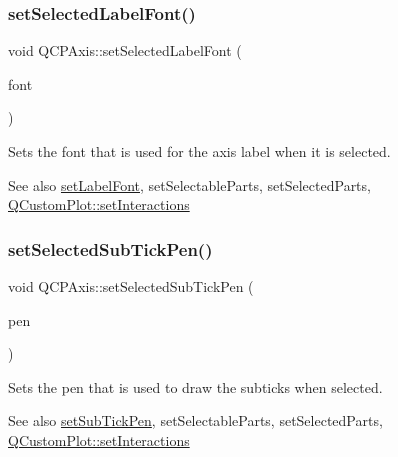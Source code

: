 \subsubsection{\texorpdfstring{set\+Selected\+Label\+Font()}{setSelectedLabelFont()}}
{\footnotesize\ttfamily void Q\+C\+P\+Axis\+::set\+Selected\+Label\+Font (\begin{DoxyParamCaption}\item[{const Q\+Font \&}]{font }\end{DoxyParamCaption})}

Sets the font that is used for the axis label when it is selected.

\begin{DoxySeeAlso}{See also}
\hyperlink{class_q_c_p_axis_a71ac1a47f7547e490a8c4311d1433cf3}{set\+Label\+Font}, set\+Selectable\+Parts, set\+Selected\+Parts, \hyperlink{class_q_custom_plot_a5ee1e2f6ae27419deca53e75907c27e5}{Q\+Custom\+Plot\+::set\+Interactions} 
\end{DoxySeeAlso}
\mbox{\label{class_q_c_p_axis_a2a00a7166600155eac26843132eb9576}} 
\subsubsection{\texorpdfstring{set\+Selected\+Sub\+Tick\+Pen()}{setSelectedSubTickPen()}}
{\footnotesize\ttfamily void Q\+C\+P\+Axis\+::set\+Selected\+Sub\+Tick\+Pen (\begin{DoxyParamCaption}\item[{const Q\+Pen \&}]{pen }\end{DoxyParamCaption})}

Sets the pen that is used to draw the subticks when selected.

\begin{DoxySeeAlso}{See also}
\hyperlink{class_q_c_p_axis_aede4028ae7516bd51a60618a8233f9cf}{set\+Sub\+Tick\+Pen}, set\+Selectable\+Parts, set\+Selected\+Parts, \hyperlink{class_q_custom_plot_a5ee1e2f6ae27419deca53e75907c27e5}{Q\+Custom\+Plot\+::set\+Interactions} 
\end{DoxySeeAlso}
\mbox{\label{class_q_c_p_axis_a9bdbf5e63ab15187f3a1de9440129227}} 
